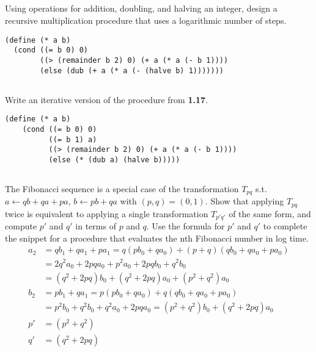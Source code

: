 \documentclass{article}
\begin{document}
\subsection{}
Using operations for addition, doubling, and halving an integer, design a recursive multiplication procedure that uses a logarithmic number of steps.

\begin{lstlisting}
(define (* a b)
  (cond ((= b 0) 0)
        ((> (remainder b 2) 0) (+ a (* a (- b 1))))
        (else (dub (+ a (* a (- (halve b) 1)))))))
\end{lstlisting}

\subsection{}
Write an iterative version of the procedure from \textbf{1.17}.
\begin{lstlisting}
(define (* a b)
    (cond ((= b 0) 0)
          ((= b 1) a)
          ((> (remainder b 2) 0) (+ a (* a (- b 1))))
          (else (* (dub a) (halve b)))))
\end{lstlisting}

\subsection{}
The Fibonacci sequence is a special case of the transformation $T_{pq}$ s.t. $a \leftarrow qb + qa + pa$, $b \leftarrow pb + qa$ with $(p, q) = (0, 1)$. Show that applying $T_{pq}$ twice is equivalent to applying a single transformation $T_{p'q'}$ of the same form, and compute $p'$ and $q'$ in terms of $p$ and $q$. Use the formula for $p'$ and $q'$ to complete the snippet for a procedure that evaluates the nth Fibonacci number in log time.
\begin{align}
a_2 &= qb_1 + qa_1 + pa_1 = q(pb_0 + qa_0) + (p + q)(qb_0 + qa_0 + pa_0)\\
    &= 2q^2a_0 + 2pqa_0 + p^2a_0 + 2pqb_0 + q^2b_0\\
    &= (q^2 + 2pq)b_0 + (q^2 + 2pq)a_0 + (p^2 + q^2)a_0\\
b_2 &= pb_1 + qa_1 = p(pb_0 + qa_0) + q(qb_0 + qa_0 + pa_0)\\
    &= p^2b_0 + q^2b_0 + q^2a_0 + 2pqa_0 = (p^2 + q^2)b_0 + (q^2 + 2pq)a_0\\
p' &= (p^2 + q^2)\\
q' &= (q^2 + 2pq)\\
\end{align}
\end{document}
